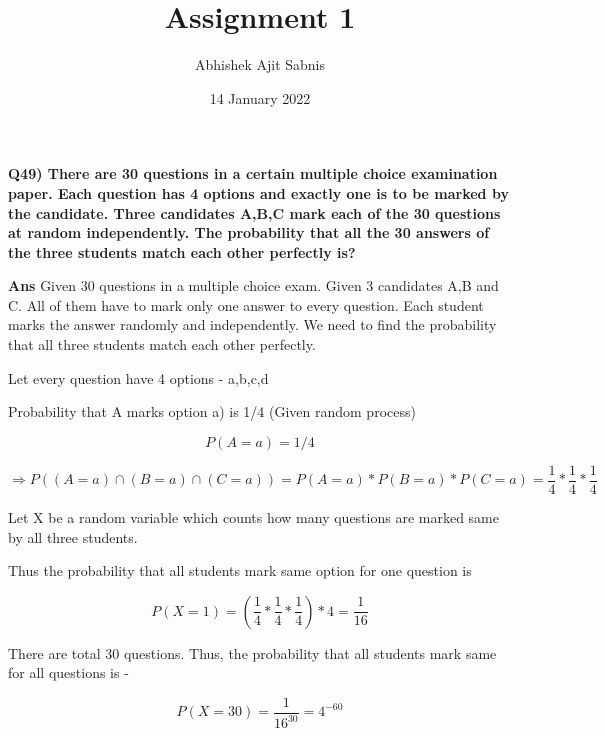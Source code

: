 \documentclass{article}
\title{\textbf{Assignment 1}}
\author{Abhishek Ajit Sabnis}
\date{14 January 2022}
\begin{document}
\maketitle

\textbf{Q49) There are 30 questions in a certain multiple choice examination paper. Each question has 4 options and exactly one is to be marked by the candidate. Three candidates A,B,C mark each of the 30 questions at random independently. The probability that all the 30 answers of the three students match each other perfectly is?}

\vspace{1cm}

\textbf{Ans}  Given 30 questions in a multiple choice exam. Given 3 candidates A,B and C. All of them have to mark only one answer to every question. Each student marks the answer randomly and independently. We need to find the probability that all three students match each other perfectly.

Let every question have 4 options - a,b,c,d
\vspace{0.5cm}

Probability that A marks option a) is 1/4 (Given random process)

\begin{equation}
    P(A=a) = 1/4
\end{equation}

\begin{equation}
    \Rightarrow P((A=a) \cap (B=a) \cap (C=a)) = P(A=a) * P(B=a) * P(C=a)  
 = \frac{1}{4} * \frac{1}{4} * \frac{1}{4}
\end{equation}

Let X be a random variable which counts how many questions are marked same by all three students. 

Thus the probability that all students mark same option for one question is
\vspace{0.5cm}

 
\begin{equation}
    P(X=1) = (\frac{1}{4} * \frac{1}{4} * \frac{1}{4}) *4 = \frac{1}{16}
\end{equation}

There are total 30 questions. Thus, the probability that all students mark same for all questions is - 

\begin{equation}
     P(X=30) = \frac{1}{16^{30}} = 4^{-60}
\end{equation}
\end{document}
